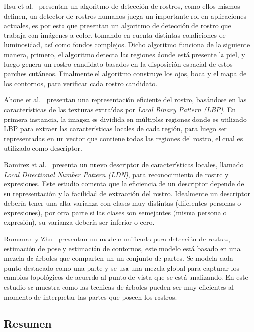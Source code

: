 Hsu et al.~\cite{Hsu2002} presentan un algoritmo de detección de rostros, como ellos mismos definen, un detector de rostros humanos juega un importante rol en aplicaciones actuales, es por esto que presentan un algoritmo de detección de rostro que trabaja con imágenes a color, tomando en cuenta distintas condiciones de luminosidad, así como fondos complejos. Dicho algoritmo funciona de la siguiente manera, primero, el algoritmo detecta las regiones donde está presente la piel, y luego genera un rostro candidato basados en la disposición espacial de estos parches cutáneos. Finalmente el algoritmo construye los ojos, boca y el mapa de los contornos, para verificar cada rostro candidato.

Ahone et al.~\cite{ahonen2006} presentan una representación eficiente del rostro, basándose en las características de las texturas extraídas por \textit{Local Binary Pattern (LBP)}. En primera instancia, la imagen es dividida en múltiples regiones donde es utilizado LBP para extraer las características locales de cada región, para luego ser representadas en un vector que contiene todas las regiones del rostro, el cual es utilizado como descriptor.

Ramirez et al.~\cite{ldnp2013} presenta un nuevo descriptor de características locales, llamado \textit{Local Directional Number Pattern (LDN)}, para reconocimiento de rostro y expresiones. Este estudio comenta que la eficiencia de un descriptor depende de su representación y la facilidad de extracción del rostro. Idealmente un descriptor debería tener una alta varianza con clases muy distintas (diferentes personas o expresiones), por otra parte si las clases son semejantes (misma persona o expresión), su varianza debería ser inferior o cero.

Ramanan y Zhu~\cite{Zhu2012} presentan un modelo unificado para detección de rostros, estimación de pose y estimación de contornos, este modelo está basado en una mezcla de árboles que comparten un un conjunto de partes. Se modela cada punto destacado como una parte y se usa una mezcla global para capturar los cambios topológicos de acuerdo al punto de vista que se está analizando. En este estudio se muestra como las técnicas de árboles pueden ser muy eficientes al momento de interpretar las partes que poseen los rostros.

\subsection{Resumen}